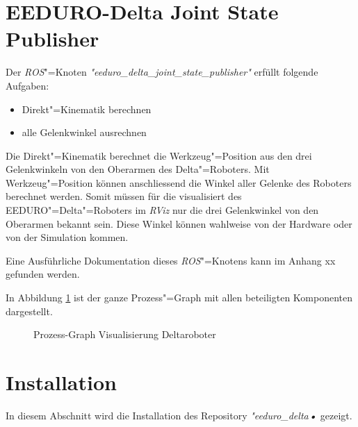 \section{EEDURO-Delta Joint State Publisher}
Der \textit{ROS}"=Knoten \textit{\textit{"}eeduro\_delta\_joint\_state\_publisher\textit{"}} erfüllt folgende Aufgaben:
\begin{itemize}
\item Direkt"=Kinematik berechnen
\item alle Gelenkwinkel ausrechnen
\end{itemize}
Die Direkt"=Kinematik berechnet die Werkzeug"=Position aus den drei Gelenkwinkeln von den Oberarmen des Delta"=Roboters.
Mit Werkzeug"=Position können anschliessend die Winkel aller Gelenke des Roboters berechnet werden.
Somit müssen für die visualisiert des EEDURO"=Delta"=Roboters im \textit{RViz} nur die drei Gelenkwinkel von den Oberarmen bekannt sein.
Diese Winkel können wahlweise von der Hardware oder von der Simulation kommen.

Eine Ausführliche Dokumentation dieses \textit{ROS}"=Knotens kann im Anhang xx gefunden werden. %

In Abbildung \ref{Ab:prozess} ist der ganze Prozess"=Graph mit allen beteiligten Komponenten dargestellt.

\begin{figure}[ht!]
	\centering
{}
	\caption{Prozess-Graph Visualisierung Deltaroboter}
	\label{Ab:prozess}
\end{figure}

\section{Installation}
In diesem Abschnitt wird die Installation des Repository \textit{\textit{"}eeduro\_delta\textbf{•}} gezeigt.

